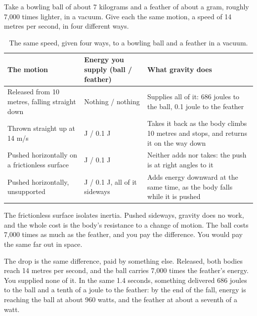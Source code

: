 Take a bowling ball of about 7 kilograms and a feather of about a gram, roughly 7{,}000 times lighter, in a vacuum. Give each the same motion, a speed of 14 metres per second, in four different ways.

\begin{table}[H]
\centering
\small
\renewcommand{\arraystretch}{1.3}
\begin{tabular}{@{}>{\raggedright\arraybackslash}p{}>{\raggedright\arraybackslash}p{}>{\raggedright\arraybackslash}p{}@{}}
\toprule
\textbf{The motion} & \textbf{Energy you supply (ball / feather)} & \textbf{What gravity does} \\
\midrule
Released from 10 metres, falling straight down & Nothing / nothing & Supplies all of it: 686 joules to the ball, 0.1 joule to the feather \\
Thrown straight up at 14 m/s & 686 J / 0.1 J & Takes it back as the body climbs 10 metres and stops, and returns it on the way down \\
Pushed horizontally on a frictionless surface & 686 J / 0.1 J & Neither adds nor takes: the push is at right angles to it \\
Pushed horizontally, unsupported & 686 J / 0.1 J, all of it sideways & Adds energy downward at the same time, as the body falls while it is pushed \\
\bottomrule
\end{tabular}
\caption{The same speed, given four ways, to a bowling ball and a feather in a vacuum.}
\label{tab:difference}
\end{table}

The frictionless surface isolates inertia. Pushed sideways, gravity does no work, and the whole cost is the body's resistance to a change of motion. The ball costs 7{,}000 times as much as the feather, and you pay the difference. You would pay the same far out in space.

The drop is the same difference, paid by something else. Released, both bodies reach 14 metres per second, and the ball carries 7{,}000 times the feather's energy. You supplied none of it. In the same 1.4 seconds, something delivered 686 joules to the ball and a tenth of a joule to the feather: by the end of the fall, energy is reaching the ball at about 960 watts, and the feather at about a seventh of a watt. 


